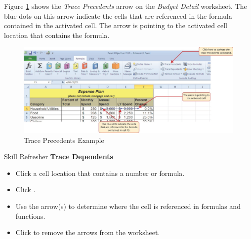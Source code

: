 Figure \ref{02:fig10} shows the \textit{Trace Precedents} arrow on the \textit{Budget Detail} worksheet. The blue dots on this arrow indicate the cells that are referenced in the formula contained in the activated cell. The arrow is pointing to the activated cell location that contains the formula.

\begin{figure}[H]
	\centering
	\includegraphics[width=\maxwidth{.95\linewidth}]{gfx/ch02_fig10}
	\caption{Trace Precedents Example}
	\label{02:fig10}
\end{figure}

\begin{center}
	\begin{sklbox}{Skill Refresher}
		\textbf{Trace Dependents}
		\\
		\begin{itemize}
			\setlength{\itemsep}{0pt}
			\setlength{\parskip}{0pt}
			\setlength{\parsep}{0pt}
			
			\item Click a cell location that contains a number or formula.
			\item Click .
			\item Use the arrow(s) to determine where the cell is referenced in formulas and functions.
			\item Click  to remove the arrows from the worksheet.
			
		\end{itemize}
	\end{sklbox}
\end{center}

